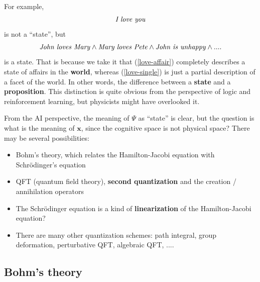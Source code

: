 \documentclass[orivec]{llncs}
\newcommand{\vect}[1]{\boldsymbol{#1}}
\newcommand{\english}[1]{\mbox{\textit{#1}}}
\begin{document}
For example,
\begin{equation}
\english{I love you}
\label{love-single}
\end{equation}
is not a ``state'', but
\begin{equation}
\english{John loves Mary} \wedge \english{Mary loves Pete} \wedge \english{John is unhappy} \wedge ....
\label{love-affair}
\end{equation}
is a state.  That is because we take it that (\ref{love-affair}) completely describes a state of affairs in the \textbf{world}, whereas (\ref{love-single}) is just a partial description of a facet of the world.  In other words, the difference between a \textbf{state} and a \textbf{proposition}.  This distinction is quite obvious from the perspective of logic and reinforcement learning, but physicists might have overlooked it.

From the AI perspective, the meaning of $\Psi$ as ``state'' is clear, but the question is what is the meaning of $\vect{x}$, since the cognitive space is not physical space?  There may be several possibilities:
\let\labelitemi\labelitemii
\begin{itemize}
	\item Bohm's theory, which relates the Hamilton-Jacobi equation with Schr\"odinger's equation
	\item QFT (quantum field theory), \textbf{second quantization} and the creation / annihilation operators
	\item The Schr\"odinger equation is a kind of \textbf{linearization} of the Hamilton-Jacobi equation?
	\item There are many other quantization schemes:  path integral, group deformation, perturbative QFT, algebraic QFT, ....
\end{itemize}

\subsection{Bohm's theory}
\end{document}
